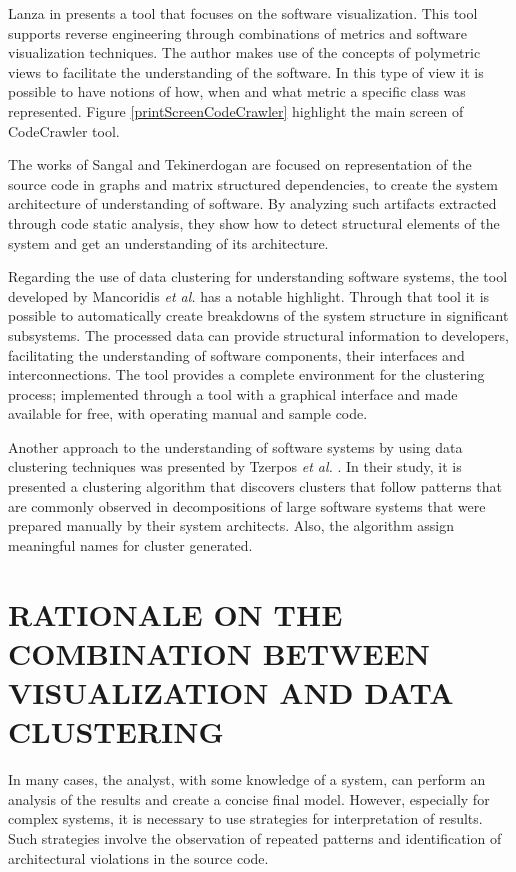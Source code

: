 \documentclass{sig-alternate-05-2015}
\begin{document}
Lanza in \cite {lanza_codecrawler-lessons_2003} presents a tool that focuses on the software visualization. This tool supports reverse engineering through combinations of metrics and software visualization techniques. The author makes use of the concepts of polymetric views to facilitate the understanding of the software. In this type of view it is possible to have notions of how, when and what metric a specific class was represented. Figure \ref{printScreenCodeCrawler} highlight the main screen of CodeCrawler tool.

The works of Sangal \cite{Sangal_2005} and Tekinerdogan \cite{Tekinerdogan_2009}  are focused on representation of the source code in graphs and matrix structured dependencies, to create the system architecture of understanding of software. By analyzing such artifacts extracted through code static analysis, they show how to detect structural elements of the system and get an understanding of its architecture.

Regarding the use of data clustering for understanding software systems, the tool developed by Mancoridis \textit {et al.} \cite {Mancoridis_1999}  has a notable highlight. Through that tool it is possible to automatically create breakdowns of the system structure in significant subsystems. The processed data can provide structural information to developers, facilitating the understanding of software components, their interfaces and interconnections. The tool provides a complete environment for the clustering process; implemented through a tool with a graphical interface and made available for free, with operating manual and sample code.

Another approach to the understanding of software systems by using data clustering techniques was presented by Tzerpos \textit{et al.} \cite {Tzerpos_vassilios}. In their study, it is presented a clustering algorithm that discovers clusters that follow patterns that are commonly observed in decompositions of large software systems that were prepared manually by their system architects.  Also, the algorithm assign meaningful names for cluster generated. 


\section{RATIONALE ON THE COMBINATION BETWEEN VISUALIZATION AND DATA CLUSTERING}%

In many cases, the analyst, with some knowledge of a system, can perform an analysis of the results and create a concise final model. However, especially for complex systems, it is necessary to use strategies for interpretation of results. Such strategies involve the observation of repeated patterns and identification of architectural violations in the source code.
\end{document}

